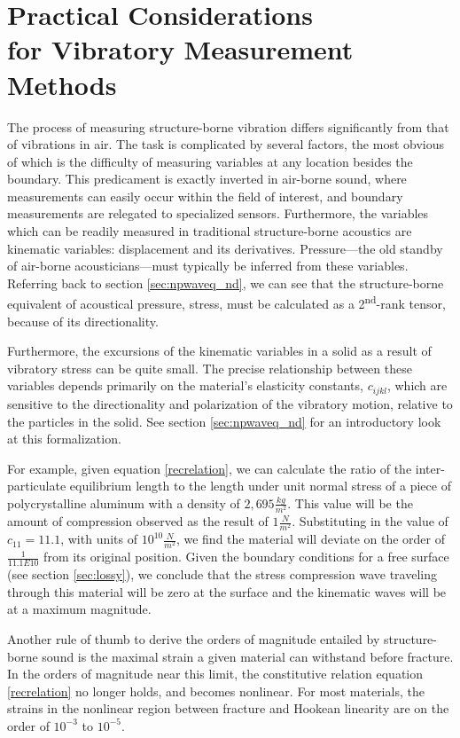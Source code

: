 \documentclass[a4paper,10pt]{report}
\numberwithin{equation}{section}
\begin{document}
\section{Practical Considerations\\ for Vibratory Measurement Methods}\label{sec:practical}
 The process of measuring structure-borne vibration differs significantly from that of vibrations in air. The task is complicated by several factors, the most obvious of which is the difficulty of measuring variables at any location besides the boundary. This predicament is exactly inverted in air-borne sound, where measurements can easily occur within the field of interest, and boundary measurements are relegated to specialized sensors. \cite[p.~3]{Cremer1973} Furthermore, the variables which can be readily measured in traditional structure-borne acoustics are kinematic variables: displacement and its derivatives. Pressure---the old standby of air-borne acousticians---must typically be inferred from these variables. Referring back to section \ref{sec:npwaveq_nd}, we can see that the structure-borne equivalent of acoustical pressure, stress, must be calculated as a 2\textsuperscript{nd}-rank tensor, because of its directionality. 

Furthermore, the excursions of the kinematic variables in a solid as a result of vibratory stress can be quite small. The precise relationship between these variables depends primarily on the material's elasticity constants, $c_{ijkl}$, which are sensitive to the directionality and polarization of the vibratory motion, relative to the particles in the solid. See section \ref{sec:npwaveq_nd} for an introductory look at this formalization. 

For example, given equation \eqref{recrelation}, we can calculate the ratio of the inter-particulate equilibrium length to the length under unit normal stress of a piece of polycrystalline aluminum with a density of $2,695 \frac{kg}{m^2}$. This value will be the amount of compression observed as the result of $1 \frac{N}{m^2}$. Substituting in the value of $c_{11} = 11.1$, with units of $10^{10} \frac{N}{m^2}$,\cite[p.~12]{Ballantine1997} we find the material will deviate on the order of $\frac{1}{11.1E10}$ from its original position. Given the boundary conditions for a free surface (see section \ref{sec:lossy}), we conclude that the stress compression wave traveling through this material will be zero at the surface and the kinematic waves will be at a maximum magnitude. 

Another rule of thumb to derive the orders of magnitude entailed by structure-borne sound is the maximal strain a given material can withstand before fracture. In the orders of magnitude near this limit, the constitutive relation equation \eqref{recrelation} no longer holds, and becomes nonlinear. For most materials, the strains in the nonlinear region between fracture and Hookean linearity are on the order of $10^{-3}$ to $10^{-5}$. \cite[p.~16]{Ballantine1997}
\end{document}
